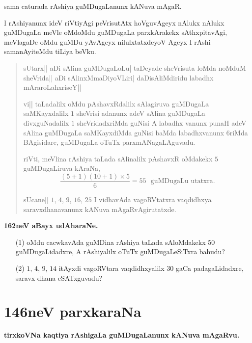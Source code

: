 sama caturada rAshiya guMDugaLanunx kANuva mAgaR.

I rAshiyanunx ideV riVtiyAgi peVrisutAtx hoVguvAgeyx nAlukx nAlukx
guMDugaLa meVle oMdoMdu guMDugaLa parxkArakekx sAthxpitavAgi,
meVlagaDe oMdu guMDu yAvAgeyx nilulxtatxdeyoV Ageyx I rAshi
samanAyiteMdu tiLiya beVku.

\begin{verse}
sUtarx|| aDi sAlina guMDugaLoLu| taDeyade sheVrisuta loMda noMduM
sheVrida|| aDi sAlinxMmaDiyoVLiri| daDisAliMdiridu labadhx
mAraroLahxriseY|| 

vi|| taLadalilx oMdu pAshavxRdalilx sAlagiruva guMDugaLa saMKayxdalilx
$1$ sheVrisi adanunx adeV sAlina guMDugaLa divxguNadalilx $1$
sheVridadxriMda guNisi A labadhx vanunx punaH adeV sAlina guMDugaLa
saMKayxdiMda guNisi baMda labadhxvanunx $6$riMda BAgisidare, guMDugaLa
oTuTx parxmANagaLAguvadu.

riVti, meVlina rAshiya taLada sAlinalilx pAshavxR oMdakekx $5$
guMDugaLiruva kAraNa,
$$
\frac{(5+1)(10+1)\times 5}{6}=55\text{~ guMDugaLu utatxra.}
$$ 

sUcane|| $1$, $4$, $9$, $16$, $25$ I vidhavAda vagoRVtatxra vaqdidhxya
saravxdhanavanunx kANuva mAgaRvAgirutatxde.
\end{verse}

\medskip
\begin{center}
{\large\bf 162neV aBayx udAharaNe.}
\end{center}

\begin{itemize}
\item[\rm(1)] oMdu cacwkavAda guMDina rAshiya taLada sAloMdakekx $50$
guMDugaLidadxre, A rAshiyalilx oTuTx guMDugaLeSiTxra bahudu?

\item[\rm(2)] $1$, $4$, $9$, $14$ itAyxdi vagoRVtara vaqdidhxyalilx
$30$ gaCa padagaLidadxre, saravx dhana eSATxguvadu?
\end{itemize}



\chapter{146neV parxkaraNa}

\begin{center}
{\large\bf tirxkoVNa kaqtiya rAshigaLa guMDugaLanunx kANuva mAgaRvu.}
\end{center}

